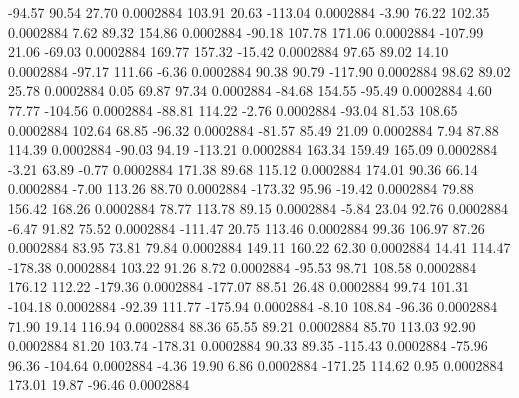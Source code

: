      -94.57       90.54       27.70     0.0002884
      103.91       20.63     -113.04     0.0002884
       -3.90       76.22      102.35     0.0002884
        7.62       89.32      154.86     0.0002884
      -90.18      107.78      171.06     0.0002884
     -107.99       21.06      -69.03     0.0002884
      169.77      157.32      -15.42     0.0002884
       97.65       89.02       14.10     0.0002884
      -97.17      111.66       -6.36     0.0002884
       90.38       90.79     -117.90     0.0002884
       98.62       89.02       25.78     0.0002884
        0.05       69.87       97.34     0.0002884
      -84.68      154.55      -95.49     0.0002884
        4.60       77.77     -104.56     0.0002884
      -88.81      114.22       -2.76     0.0002884
      -93.04       81.53      108.65     0.0002884
      102.64       68.85      -96.32     0.0002884
      -81.57       85.49       21.09     0.0002884
        7.94       87.88      114.39     0.0002884
      -90.03       94.19     -113.21     0.0002884
      163.34      159.49      165.09     0.0002884
       -3.21       63.89       -0.77     0.0002884
      171.38       89.68      115.12     0.0002884
      174.01       90.36       66.14     0.0002884
       -7.00      113.26       88.70     0.0002884
     -173.32       95.96      -19.42     0.0002884
       79.88      156.42      168.26     0.0002884
       78.77      113.78       89.15     0.0002884
       -5.84       23.04       92.76     0.0002884
       -6.47       91.82       75.52     0.0002884
     -111.47       20.75      113.46     0.0002884
       99.36      106.97       87.26     0.0002884
       83.95       73.81       79.84     0.0002884
      149.11      160.22       62.30     0.0002884
       14.41      114.47     -178.38     0.0002884
      103.22       91.26        8.72     0.0002884
      -95.53       98.71      108.58     0.0002884
      176.12      112.22     -179.36     0.0002884
     -177.07       88.51       26.48     0.0002884
       99.74      101.31     -104.18     0.0002884
      -92.39      111.77     -175.94     0.0002884
       -8.10      108.84      -96.36     0.0002884
       71.90       19.14      116.94     0.0002884
       88.36       65.55       89.21     0.0002884
       85.70      113.03       92.90     0.0002884
       81.20      103.74     -178.31     0.0002884
       90.33       89.35     -115.43     0.0002884
      -75.96       96.36     -104.64     0.0002884
       -4.36       19.90        6.86     0.0002884
     -171.25      114.62        0.95     0.0002884
      173.01       19.87      -96.46     0.0002884
